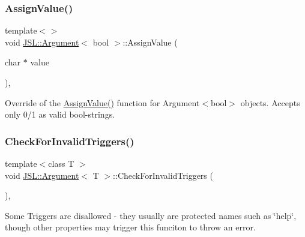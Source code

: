 \mbox{\label{classJSL_1_1Argument_ac71e37555de1dea3b6d297bf0909a920}} 
\subsubsection{\texorpdfstring{Assign\+Value()}{AssignValue()}\hspace{0.1cm}{\footnotesize\ttfamily [6/6]}}
{\footnotesize\ttfamily template$<$$>$ \\
void \hyperlink{classJSL_1_1Argument}{J\+S\+L\+::\+Argument}$<$ bool $>$\+::Assign\+Value (\begin{DoxyParamCaption}\item[{char $\ast$}]{value }\end{DoxyParamCaption})\hspace{0.3cm}{\ttfamily [inline]}, {\ttfamily [private]}}



Override of the \hyperlink{classJSL_1_1Argument_abc43696d406a6d369cd1b3d8cb1540b5}{Assign\+Value()} function for Argument$<$bool$>$ objects. Accepts only 0/1 as valid bool-\/strings. 

\mbox{\label{classJSL_1_1Argument_a8614eb66f807132c4323847e05e666c4}} 
\subsubsection{\texorpdfstring{Check\+For\+Invalid\+Triggers()}{CheckForInvalidTriggers()}}
{\footnotesize\ttfamily template$<$class T $>$ \\
void \hyperlink{classJSL_1_1Argument}{J\+S\+L\+::\+Argument}$<$ T $>$\+::Check\+For\+Invalid\+Triggers (\begin{DoxyParamCaption}{ }\end{DoxyParamCaption})\hspace{0.3cm}{\ttfamily [inline]}, {\ttfamily [private]}}



Some Triggers are disallowed -\/ they usually are protected names such as \char`\"{}help\char`\"{}, though other properties may trigger this funciton to throw an error. 

